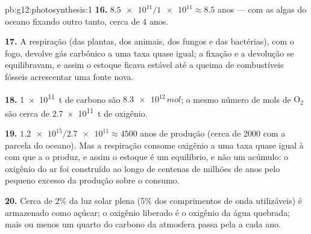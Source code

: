 \begin{solution}{pb:g12:photosynthesis:1}
\textbf{16.} $\num{8.5e11}/\num{1e11} \approx 8.5$ anos --- com as
algas do oceano fixando outro tanto, cerca de 4 anos.

\textbf{17.} A respiração (das plantas, dos animais, dos fungos e das
bactérias), com o fogo, devolve gás carbônico a uma taxa quase igual; a
fixação e a devolução se equilibravam, e assim o estoque ficava estável
até a queima de combustíveis fósseis acrescentar uma fonte nova.

\textbf{18.} \qty{1e11}{t} de carbono são $\num{8.3e12}\,\unit{mol}$; o
mesmo número de mols de $\mathrm{O_2}$ são cerca de \qty{2.7e11}{t} de
oxigênio.

\textbf{19.} $\num{1.2e15}/\num{2.7e11} \approx 4500$ anos de produção
(cerca de 2000 com a parcela do oceano). Mas a respiração consome
oxigênio a uma taxa quase igual à com que a  o produz, e
assim o estoque é um equilíbrio, e não um acúmulo: o oxigênio do ar foi
construído ao longo de centenas de milhões de anos pelo pequeno excesso
da produção sobre o consumo.

\textbf{20.} Cerca de 2\% da luz solar plena (5\% dos comprimentos de
onda utilizáveis) é armazenado como açúcar; o oxigênio liberado é o
oxigênio da água quebrada; mais ou menos um quarto do carbono da
atmosfera passa pela  a cada ano.
\end{solution}
